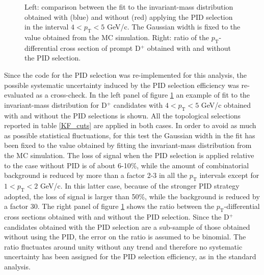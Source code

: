 \documentclass[b5paper,10pt,twoside,oldstyle,classica]{toptesi}
\newcommand{\pt}{p_\text{T}}
\begin{document}
\begin{figure}[tb]
\begin{center}
\caption{Left: comparison between the fit to the invariant-mass distribution obtained with (blue) and without (red) applying the PID selection in the interval $4<\pt<5$ GeV/c. The Gaussian width is fixed to the value obtained from the MC simulation. Right: ratio of the $\pt$-differential cross section of prompt D$^+$ obtained with and without the PID selection.}
\label{KF_PID_syst}
\end{center}
\end{figure} 
Since the code for the PID selection was re-implemented for this analysis, the possible systematic uncertainty induced by the PID selection efficiency was re-evaluated as a cross-check. In the left panel of figure \ref{KF_PID_syst} an example of fit to 
the invariant-mass distribution for D$^+$ candidates with $4<\pt<5$ GeV/c obtained with and without the PID selections is shown. All the topological selections reported in table \ref{KF_cuts} are applied in both cases. In order to avoid as much as possible statistical fluctuations, for this test the Gaussian width in the fit has been fixed to the value obtained by fitting the invariant-mass distribution from the MC simulation. The loss of signal when the PID selection is applied relative to the case without PID is of about 6-10\%, while the amount of combinatorial background is reduced by more than a factor 2-3 in all the $\pt$ intervals except for $1<\pt<2$ GeV/c. In this latter case, because of the stronger PID strategy adopted, the loss of signal is larger than 50\%, while the background is reduced by a factor 30. The right panel of figure \ref{KF_PID_syst} shows the ratio between the $\pt$-differential cross sections obtained with and without the PID selection. Since the D$^+$ candidates obtained with the PID selection are a sub-sample of those obtained without using the PID, the error on the ratio is assumed to be binomial. The ratio fluctuates around unity without any trend and therefore no systematic uncertainty has been assigned for the PID selection efficiency, as in the standard analysis.
\end{document}
